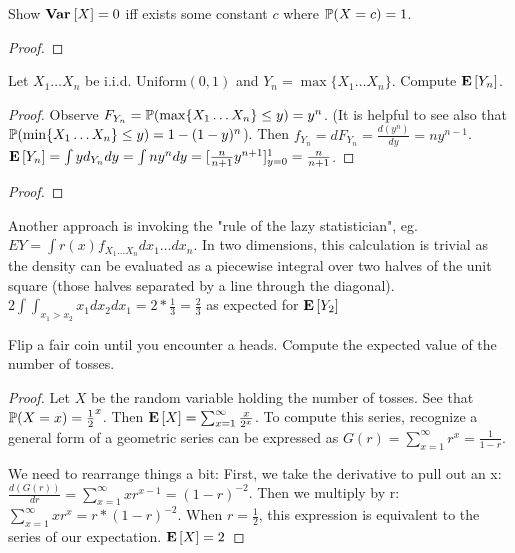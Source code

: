 \documentclass[10pt]{article}
\begin{document}
\setcounter{exercise}{1}
\begin{exercise}
    Show $\Var{X} = 0$ iff exists some constant $c$ where $\P(X = c) = 1$.
\end{exercise}

\begin{proof}
\end{proof}

\setcounter{exercise}{2}
\begin{exercise}
    Let $X_1 \dots X_n$ be i.i.d. $\text{Uniform}(0, 1)$ and $Y_n = \max\{X_1 \dots
    X_n\}$. Compute $\E{Y_n}$.
\end{exercise}

\begin{proof}
    Observe $F_{Y_n} = \P(\max\{X_1 \dots X_n\} \leq y) = y^n$. (It is helpful to
    see also that $\P(\min\{X_1 \dots X_n\} \leq y) = 1-(1-y)^n$). Then
    $f_{Y_n} = dF_{Y_n} = \frac{d(y^n)}{dy} = ny^{n-1}$. $\E{Y_n} = \int y
    d_{Y_n} dy = \int  ny^n dy = [\frac{n}{n+1}y^{n+1}]_{y=0}^{1} =
    \frac{n}{n+1}$.
\end{proof}


\setcounter{exercise}{3}
\begin{exercise}
\end{exercise}

\begin{proof}
\end{proof}

\begin{note}
    Another approach is invoking the "rule of the lazy statistician", eg. $E{Y} = \int r(x) f_{X_1 \dots X_n} dx_1
    \dots dx_n$. In two dimensions, this calculation is trivial as the density
    can be evaluated as a piecewise integral over two halves of the unit square
    (those halves separated by a line through the diagonal). $2
    \int \int_{x_1 > x_2} x_1 dx_2 dx_1 = 2 * \frac{1}{3} = \frac{2}{3}$ as
    expected for $\E{Y_2}$
\end{note}

\setcounter{exercise}{4}
\begin{exercise}
    Flip a fair coin until you encounter a heads. Compute the expected value of
    the number of tosses.
\end{exercise}

\begin{proof}
    Let $X$ be the random variable holding the number of tosses. See that $\P(X
    = x) = \frac{1}{2}^x$. Then $\E{X} = \sum_{x=1}^{\infty} \frac{x}{2^x}$. To
    compute this series, recognize a general form of a geometric series can be
    expressed as $G(r) = \sum_{x=1}^{\infty} r^x = \frac{1}{1-r}$. 

    We need to rearrange things a bit:
    First, we take the derivative to pull out an x: $\frac{d(G(r))}{dr} = \sum_{x=1}^{\infty} xr^{x-1} =
    (1-r)^{-2}$. Then we multiply by r: $\sum_{x=1}^{\infty} xr^x =
    r*(1-r)^{-2}$.
    When $r=\frac{1}{2}$, this expression is equivalent to the series
    of our expectation. $\E{X} = 2$
\end{proof}
\end{document}
